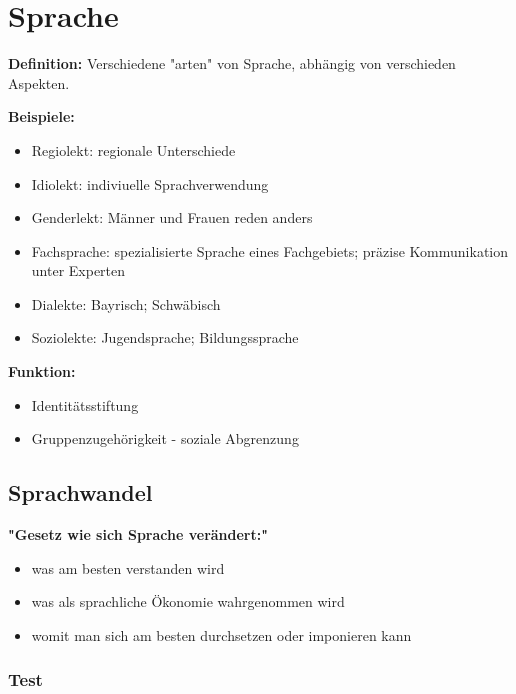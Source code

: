 
\section{Sprache}

\textbf{Definition:} 
Verschiedene "arten" von Sprache, abhängig von verschieden Aspekten.

\textbf{Beispiele:}
\begin{itemize}
    \item Regiolekt: regionale Unterschiede
    \item Idiolekt: indiviuelle Sprachverwendung
    \item Genderlekt: Männer und Frauen reden anders
    \item Fachsprache: spezialisierte Sprache eines Fachgebiets; präzise Kommunikation unter Experten
    \item Dialekte: Bayrisch; Schwäbisch
    \item Soziolekte: Jugendsprache; Bildungssprache
\end{itemize}

\textbf{Funktion:}
\begin{itemize}
    \item Identitätsstiftung
    \item Gruppenzugehörigkeit - soziale Abgrenzung
\end{itemize}


\subsection{Sprachwandel}

\textbf{"Gesetz wie sich Sprache verändert:"}
\begin{itemize}
    \item was am besten verstanden wird
    \item was als sprachliche Ökonomie wahrgenommen wird
    \item womit man sich am besten durchsetzen oder imponieren kann
\end{itemize}


\subsubsection{Test}

